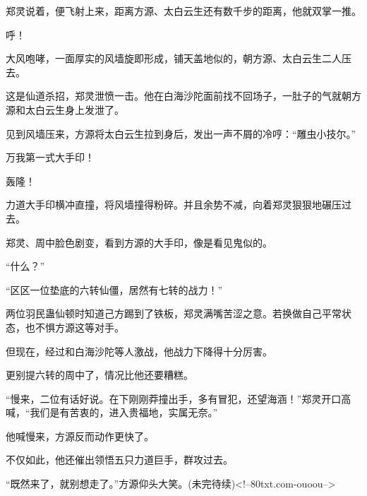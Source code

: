 \begin{this_body}
郑灵说着，便飞射上来，距离方源、太白云生还有数千步的距离，他就双掌一推。

呼！

大风咆哮，一面厚实的风墙旋即形成，铺天盖地似的，朝方源、太白云生二人压去。

这是仙道杀招，郑灵泄愤一击。他在白海沙陀面前找不回场子，一肚子的气就朝方源和太白云生身上发泄了。

见到风墙压来，方源将太白云生拉到身后，发出一声不屑的冷哼：“雕虫小技尔。”

万我第一式大手印！

轰隆！

力道大手印横冲直撞，将风墙撞得粉碎。并且余势不减，向着郑灵狠狠地碾压过去。

郑灵、周中脸色剧变，看到方源的大手印，像是看见鬼似的。

“什么？”

“区区一位垫底的六转仙僵，居然有七转的战力！”

两位羽民蛊仙顿时知道己方踢到了铁板，郑灵满嘴苦涩之意。若换做自己平常状态，也不惧方源这等对手。

但现在，经过和白海沙陀等人激战，他战力下降得十分厉害。

更别提六转的周中了，情况比他还要糟糕。

“慢来，二位有话好说。在下刚刚莽撞出手，多有冒犯，还望海涵！”郑灵开口高喊，“我们是有苦衷的，进入贵福地，实属无奈。”

他喊慢来，方源反而动作更快了。

不仅如此，他还催出领悟五只力道巨手，群攻过去。

“既然来了，就别想走了。”方源仰头大笑。(未完待续)<!--80txt.com-ouoou-->

\end{this_body}

